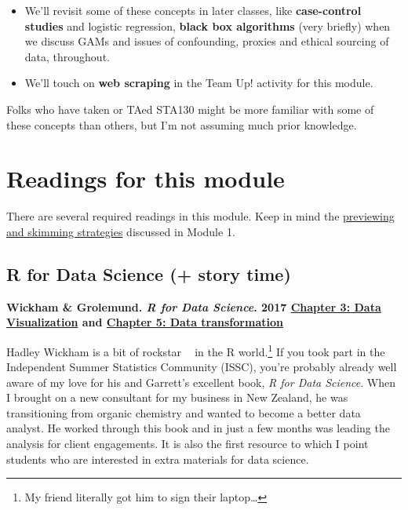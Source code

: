 \documentclass[
  openany]{book}
\providecommand{\tightlist}{%
  \setlength{\itemsep}{0pt}\setlength{\parskip}{0pt}}
\begin{document}
\begin{itemize}
\tightlist
\item
  We'll revisit some of these concepts in later classes, like \textbf{case-control studies} and logistic regression, \textbf{black box algorithms} (very briefly) when we discuss GAMs and issues of confounding, proxies and ethical sourcing of data, throughout.
\item
  We'll touch on \textbf{web scraping} in the Team Up! activity for this module.
\end{itemize}

Folks who have taken or TAed STA130 might be more familiar with some of these concepts than others, but I'm not assuming much prior knowledge.

\hypertarget{readings-for-this-module}{%
\section{Readings for this module}\label{readings-for-this-module}}

There are several required readings in this module. Keep in mind the \protect\hyperlink{previewskim}{previewing and skimming strategies} discussed in Module 1.

\hypertarget{r-for-data-science-story-time}{%
\subsection{R for Data Science (+ story time)}\label{r-for-data-science-story-time}}

\textbf{Wickham \& Grolemund. \emph{R for Data Science}. 2017 \href{https://r4ds.had.co.nz/data-visualisation.html}{Chapter 3: Data Visualization} and \href{https://r4ds.had.co.nz/transform.html}{Chapter 5: Data transformation}}

Hadley Wickham is a bit of rockstar 👨‍🎤 in the R world.\footnote{My friend literally got him to sign their laptop\ldots{}} If you took part in the Independent Summer Statistics Community (ISSC), you're probably already well aware of my love for his and Garrett's excellent book, \emph{R for Data Science}. When I brought on a new consultant for my business in New Zealand, he was transitioning from organic chemistry and wanted to become a better data analyst. He worked through this book and in just a few months was leading the analysis for client engagements. It is also the first resource to which I point students who are interested in extra materials for data science.
\end{document}
